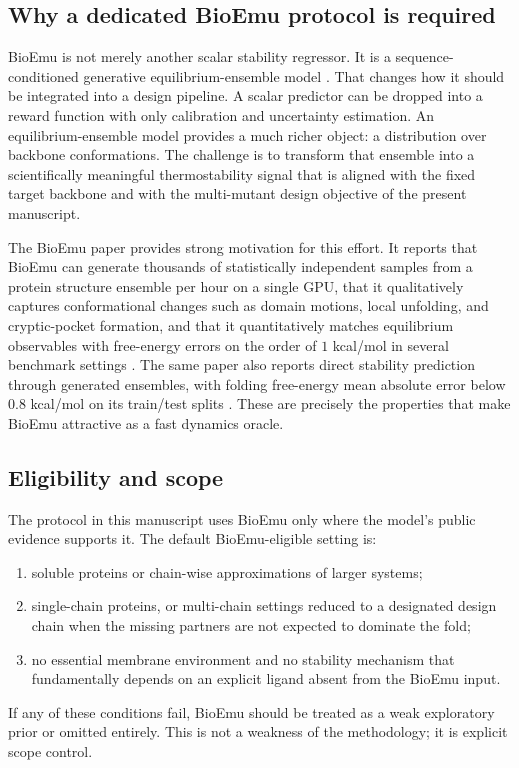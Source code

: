 \documentclass[11pt]{article}
\begin{document}
	\subsection{Why a dedicated BioEmu protocol is required}
	
	BioEmu is not merely another scalar stability regressor. It is a sequence-conditioned generative equilibrium-ensemble model \citep{lewis2024bioemu}. That changes how it should be integrated into a design pipeline. A scalar predictor can be dropped into a reward function with only calibration and uncertainty estimation. An equilibrium-ensemble model provides a much richer object: a distribution over backbone conformations. The challenge is to transform that ensemble into a scientifically meaningful thermostability signal that is aligned with the fixed target backbone and with the multi-mutant design objective of the present manuscript.
	
	The BioEmu paper provides strong motivation for this effort. It reports that BioEmu can generate thousands of statistically independent samples from a protein structure ensemble per hour on a single GPU, that it qualitatively captures conformational changes such as domain motions, local unfolding, and cryptic-pocket formation, and that it quantitatively matches equilibrium observables with free-energy errors on the order of $1$ kcal/mol in several benchmark settings \citep{lewis2024bioemu}. The same paper also reports direct stability prediction through generated ensembles, with folding free-energy mean absolute error below $0.8$ kcal/mol on its train/test splits \citep{lewis2024bioemu}. These are precisely the properties that make BioEmu attractive as a fast dynamics oracle.
	
	\subsection{Eligibility and scope}
	
	The protocol in this manuscript uses BioEmu only where the model's public evidence supports it. The default BioEmu-eligible setting is:
	\begin{enumerate}[leftmargin=1.5em]
		\item soluble proteins or chain-wise approximations of larger systems;
		\item single-chain proteins, or multi-chain settings reduced to a designated design chain when the missing partners are not expected to dominate the fold;
		\item no essential membrane environment and no stability mechanism that fundamentally depends on an explicit ligand absent from the BioEmu input.
	\end{enumerate}
	If any of these conditions fail, BioEmu should be treated as a weak exploratory prior or omitted entirely. This is not a weakness of the methodology; it is explicit scope control.
	
\end{document}
